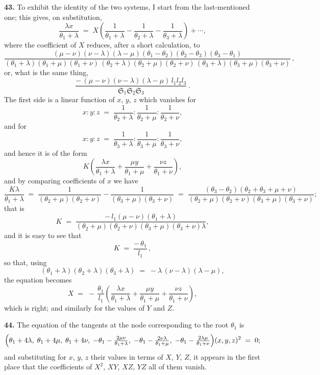 \documentclass[11pt,a4paper]{article}
\begin{document}
\textbf{43.} To exhibit the identity of the two systems, I start from the last-mentioned one; this gives, on substitution,
\[
\frac{\lambda x}{\theta_{1}+\lambda} \;=\; X\!\left(\frac{1}{\theta_{1}+\lambda}-\frac{1}{\theta_{2}+\lambda}-\frac{1}{\theta_{3}+\lambda}\right) + \cdots,
\]
where the coefficient of $X$ reduces, after a short calculation, to
\[
\frac{(\mu-\nu)(\nu-\lambda)(\lambda-\mu)(\theta_{1}-\theta_{2})(\theta_{2}-\theta_{3})(\theta_{3}-\theta_{1})}{(\theta_{1}+\lambda)(\theta_{1}+\mu)(\theta_{1}+\nu)\,(\theta_{2}+\lambda)(\theta_{2}+\mu)(\theta_{2}+\nu)\,(\theta_{3}+\lambda)(\theta_{3}+\mu)(\theta_{3}+\nu)}\,,
\]
or, what is the same thing,
\[
\frac{-\,(\mu-\nu)(\nu-\lambda)(\lambda-\mu)\,l_{1}l_{2}l_{3}}{\mathfrak{S}_{1}\mathfrak{S}_{2}\mathfrak{S}_{3}}\,.
\]
The first side is a linear function of $x$, $y$, $z$ which vanishes for
\[
x:y:z \;=\; \frac{1}{\theta_{2}+\lambda} : \frac{1}{\theta_{2}+\mu} : \frac{1}{\theta_{2}+\nu},
\]
and for
\[
x:y:z \;=\; \frac{1}{\theta_{3}+\lambda} : \frac{1}{\theta_{3}+\mu} : \frac{1}{\theta_{3}+\nu},
\]
and hence it is of the form
\[
K\!\left(\frac{\lambda x}{\theta_{1}+\lambda} + \frac{\mu y}{\theta_{1}+\mu} + \frac{\nu z}{\theta_{1}+\nu}\right),
\]
and by comparing coefficients of $x$ we have
\[
\frac{K\lambda}{\theta_{1}+\lambda} \;=\; \frac{1}{(\theta_{2}+\mu)(\theta_{2}+\nu)} - \frac{1}{(\theta_{3}+\mu)(\theta_{3}+\nu)} \;=\; \frac{(\theta_{3}-\theta_{2})(\theta_{2}+\theta_{3}+\mu+\nu)}{(\theta_{2}+\mu)(\theta_{2}+\nu)(\theta_{3}+\mu)(\theta_{3}+\nu)};
\]
that is
\[
K \;=\; \frac{-\,l_{1}(\mu-\nu)(\theta_{1}+\lambda)}{(\theta_{2}+\mu)(\theta_{2}+\nu)(\theta_{3}+\mu)(\theta_{3}+\nu)\lambda},
\]
and it is easy to see that
\[
K \;=\; \frac{-\,\theta_{1}}{l_{1}}\,,
\]
so that, using
\[
(\theta_{1}+\lambda)(\theta_{2}+\lambda)(\theta_{3}+\lambda) \;=\; -\lambda\,(\nu-\lambda)(\lambda-\mu),
\]
the equation becomes
\[
X \;=\; -\,\frac{\theta_{1}}{l_{1}}\!\left(\frac{\lambda x}{\theta_{1}+\lambda}+\frac{\mu y}{\theta_{1}+\mu}+\frac{\nu z}{\theta_{1}+\nu}\right),
\]
which is right; and similarly for the values of $Y$ and $Z$.

\medskip

\textbf{44.} The equation of the tangents at the node corresponding to the root $\theta_{1}$ is
\[
\Bigl(\theta_{1}+4\lambda,\;\theta_{1}+4\mu,\;\theta_{1}+4\nu,\;-\theta_{1}-\tfrac{2\mu\nu}{\theta_{1}+\lambda},\;-\theta_{1}-\tfrac{2\nu\lambda}{\theta_{1}+\mu},\;-\theta_{1}-\tfrac{2\lambda\mu}{\theta_{1}+\nu}\Bigr)(x,y,z)^{2} \;=\; 0;
\]
and substituting for $x$, $y$, $z$ their values in terms of $X$, $Y$, $Z$, it appears in the first place that the coefficients of $X^{2}$, $XY$, $XZ$, $YZ$ all of them vanish.
\end{document}
